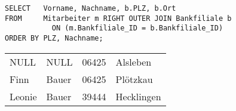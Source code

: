           \begin{lstlisting}[language=ms_sql,caption={Der gleiche Right-Outer-Join in MS SQL Server},label=sql04_16]
SELECT   Vorname, Nachname, b.PLZ, b.Ort
FROM     Mitarbeiter m RIGHT OUTER JOIN Bankfiliale b
           ON (m.Bankfiliale_ID = b.Bankfiliale_ID)
ORDER BY PLZ, Nachname;
          \end{lstlisting}
          \begin{center}
            \begin{small}
              \tablehead{}
              \tabletail {
              }
              \begin{mssql}
                \begin{supertabular}{llll}
									NULL & NULL & 06425 & Alsleben \\
									Finn & Bauer & 06425 & Plötzkau \\
									Leonie & Bauer & 39444 & Hecklingen \\
                \end{supertabular}
              \end{mssql}
            \end{small}
          \end{center}
